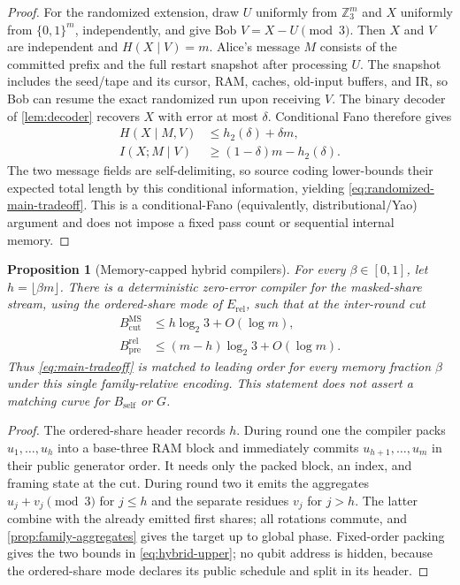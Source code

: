 \documentclass[aps,prx,reprint,floatfix,superscriptaddress]{revtex4-2}
\newtheorem{proposition}{Proposition}
\begin{document}
\begin{proof}
For the randomized extension, draw $U$ uniformly from $\mathbb Z_3^m$ and
$X$ uniformly from $\{0,1\}^m$, independently, and give Bob
$V=X-U\pmod3$.  Then $X$ and $V$ are independent and $H(X\mid V)=m$.
Alice's message $M$ consists of the committed prefix and the full restart
snapshot after processing $U$.  The snapshot includes the seed/tape and its
cursor, RAM, caches, old-input buffers, and IR, so Bob can resume the exact
randomized run upon receiving $V$.  The binary decoder of
\cref{lem:decoder} recovers $X$ with error at most $\delta$.  Conditional
Fano therefore gives
\begin{align*}
 H(X\mid M,V)&\leq h_2(\delta)+\delta m,\\
 I(X;M\mid V)&\geq(1-\delta)m-h_2(\delta).
\end{align*}
The two message fields are self-delimiting, so source coding lower-bounds
their expected total length by this conditional information, yielding
\eqref{eq:randomized-main-tradeoff}.  This is a conditional-Fano
(equivalently, distributional/Yao) argument and does not impose a fixed pass
count or sequential internal memory.
\end{proof}

\begin{proposition}[Memory-capped hybrid compilers]
\label{prop:hybrid-upper}
For every $\beta\in[0,1]$, let $h=\lfloor\beta m\rfloor$.  There is a
deterministic zero-error compiler for the masked-share stream, using the
ordered-share mode of $E_{\mathrm{rel}}$, such that at the inter-round cut
\begin{equation}\label{eq:hybrid-upper}
\begin{aligned}
 B_{\mathrm{cut}}^{\mathrm{MS}}
 &\leq h\log_2 3+O(\log m),\\
 B_{\mathrm{pre}}^{\mathrm{rel}}
 &\leq(m-h)\log_2 3+O(\log m).
\end{aligned}
\end{equation}
Thus \eqref{eq:main-tradeoff} is matched to leading order for every memory
fraction $\beta$ under this single family-relative encoding.  This statement
does not assert a matching curve for $B_{\mathrm{self}}$ or $G$.
\end{proposition}

\begin{proof}
The ordered-share header records $h$.  During round one the compiler packs
$u_1,\ldots,u_h$ into a base-three RAM block and immediately commits
$u_{h+1},\ldots,u_m$ in their public generator order.  It needs only the
packed block, an index, and framing state at the cut.  During round two it
emits the aggregates $u_j+v_j\pmod3$ for $j\leq h$ and the separate residues
$v_j$ for $j>h$.  The latter combine with the already emitted first shares;
all rotations commute, and \cref{prop:family-aggregates} gives the target up
to global phase.  Fixed-order packing gives the two bounds in
\eqref{eq:hybrid-upper}; no qubit address is hidden, because the ordered-share
mode declares its public schedule and split in its header.
\end{proof}
\end{document}
